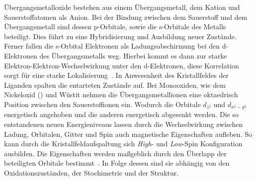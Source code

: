         Übergangsmetalloxide bestehen aus einem Übergangsmetall, dem Kation und Sauerstoffatomen als Anion.
        Bei der Bindung zwischen dem Sauerstoff und dem Übergangsmetall sind dessen p-Orbitale, sowie die s-Orbitale des Metalls beteiligt.
        Dies führt zu eine Hybridisierung und Ausbildung neuer Zustände.
        Ferner fallen die s-Orbital Elektronen als Ladungsabschirmung bei den d-Elektronen des Übergangsmetalls weg.
        Hierbei kommt es dann zur starke Elektron-Elektron-Wechselwirkung unter den d-Elektronen, diese Korrelation sorgt für eine starke Lokalisierung~\cite{dane_beschreibung_2008}.
        In Anwesenheit des Kristallfeldes der Liganden spalten die entarteten Zustände auf.
        Bei Monooxiden, wie dem Nickeloxid () und Wüstit nehmen die Übergangsmetallionen eine oktaedrisch Position zwischen den Sauerstoffionen ein.
        Wodurch die Orbitale $d_{z^2}$ und $d_{x^2-y^2}$ energetisch angehoben und die anderen energetisch abgesenkt werden.
        Die so entstandenen neuen Energieniveaus lassen durch die Wechselwirkung zwischen Ladung, Orbitalen, Gitter und Spin auch magnetische Eigenschaften aufleben.
        So kann durch die Kristallfeldaufspaltung sich \textit{High}- und \textit{Low}-Spin Konfiguration ausbilden.
        Die Eigenschaften werden maßgeblich durch den Überlapp der beteiligten Orbitale bestimmt~\cite{kupper_electronic_2005}.
        In Folge dessen sind sie abhängig von den Oxidationszuständen, der Stochimetrie und der Struktur.

